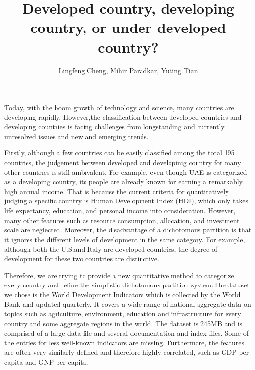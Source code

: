 \documentclass[a4paper]{article}
\title{Developed country, developing country, or under developed country?}
\author{Lingfeng Cheng, Mihir Paradkar, Yuting Tian}
\begin{document}
\maketitle



Today, with the boom growth of technology and science, many countries are developing rapidly. However,the classification between developed countries and developing countries is facing challenges from longstanding and currently unresolved issues and new and emerging trends.

Firstly, although a few countries can be easily classified among the total 195 countries, the judgement between developed and developinig country for many other countries is still ambivalent. For example, even though UAE is categorized as a developing country, its people are already known for earning a remarkably high annual income. That is because the current criteria for quantitatively judging a specific country is Human Development Index (HDI), which only takes life expectancy, education, and personal income into consideration. However, many other features such as resource consumption, allocation, and investment scale are neglected. Moreover, the disadvantage of a dichotomous partition is that it ignores the different levels of development in the same category. For example, although both the U.S.and Italy are developed countries, the degree of development for these two countries are distinctive.

Therefore, we are trying to provide a new quantitative method to categorize every country and refine the simplistic dichotomous partition system.The dataset we chose is the World Development Indicators which is collected by the World Bank and updated quarterly. It covers a wide range of national aggregate data on topics such as agriculture, environment, education and infrastructure for every country and some aggregate regions in the world. The dataset is 245MB and is comprised of a large data file and several documentation and index files. Some of the entries for less well-known indicators are missing. Furthermore, the features are often very similarly defined and therefore highly correlated, such as GDP per capita and GNP per capita.
\end{document}
